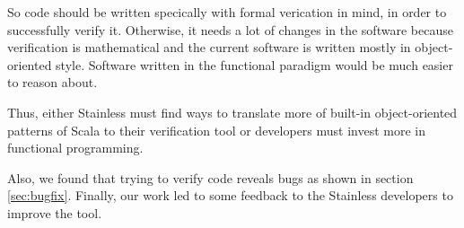 \documentclass[runningheads]{llncs}
\begin{document}
So code should be written specically with formal verication in mind,
in order to successfully verify it.  Otherwise, it needs a lot of
changes in the software because verification is mathematical and the
current software is written mostly in object-oriented style.  Software
written in the functional paradigm would be much easier to reason
about.

Thus, either Stainless must find ways to translate more of built-in
object-oriented patterns of Scala to their verification tool or
developers must invest more in functional programming.

Also, we found that trying to verify code reveals bugs as shown in
section \ref{sec:bugfix}.  Finally, our work led to some feedback to
the Stainless developers to improve the tool.









\end{document}
